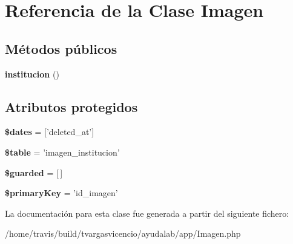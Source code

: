 \hypertarget{class_app_1_1_imagen}{\section{\-Referencia de la \-Clase \-Imagen}
\label{class_app_1_1_imagen}
}
\subsection*{\-Métodos públicos}
\begin{DoxyCompactItemize}
\item 
\hypertarget{class_app_1_1_imagen_abfb0e179daf0a8f710adbb1456e5b3eb}{{\bfseries institucion} ()}\label{class_app_1_1_imagen_abfb0e179daf0a8f710adbb1456e5b3eb}

\end{DoxyCompactItemize}
\subsection*{\-Atributos protegidos}
\begin{DoxyCompactItemize}
\item 
\hypertarget{class_app_1_1_imagen_aab581066837d6296ba35c72937b6fc1c}{{\bfseries \$dates} = \mbox{[}'deleted\-\_\-at'\mbox{]}}\label{class_app_1_1_imagen_aab581066837d6296ba35c72937b6fc1c}

\item 
\hypertarget{class_app_1_1_imagen_ae8876a14058f368335baccf35af4a22b}{{\bfseries \$table} = 'imagen\-\_\-institucion'}\label{class_app_1_1_imagen_ae8876a14058f368335baccf35af4a22b}

\item 
\hypertarget{class_app_1_1_imagen_a5758640ec23bdc1a6850649763244e86}{{\bfseries \$guarded} = \mbox{[}$\,$\mbox{]}}\label{class_app_1_1_imagen_a5758640ec23bdc1a6850649763244e86}

\item 
\hypertarget{class_app_1_1_imagen_a927b0256b942a3ee89485f2649af7981}{{\bfseries \$primary\-Key} = 'id\-\_\-imagen'}\label{class_app_1_1_imagen_a927b0256b942a3ee89485f2649af7981}

\end{DoxyCompactItemize}


\-La documentación para esta clase fue generada a partir del siguiente fichero\-:\begin{DoxyCompactItemize}
\item 
/home/travis/build/tvargasvicencio/ayudalab/app/\-Imagen.\-php\end{DoxyCompactItemize}
